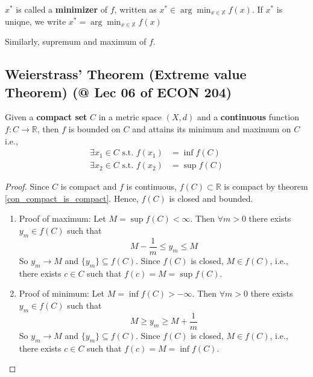 \documentclass[11pt]{elegantbook}
\begin{document}
$x^{*}$ is called a \textbf{minimizer} of $f$, written as $x^{*} \in \arg \min _{x \in \mathbb{X}} f(x)$. If $x^*$ is uniqne, we write $x^{*}=\arg \min _{x \in \mathbb{X}} f(x)
$

Similarly, supremum and maximum of $f$.

\subsection{Weierstrass' Theorem (Extreme value Theorem) \small{(@ Lec 06 of ECON 204)}}
\begin{theorem}
    Given a \textbf{compact set} $C$ in a metric space $(X, d)$ and a \textbf{continuous} function $f: C \rightarrow \mathbb{R}$, then $f$ is bounded on $C$ and attains its minimum and maximum on $C$ i.e.,
    $$
    \begin{aligned}
    \exists x_1 \in C \text { s.t. } f\left(x_{1}\right) &=\inf f(C) \\
    \exists x_{2} \in C \text { s.t. } f\left(x_{2}\right) &=\sup f(C)
    \end{aligned}
    $$
\end{theorem}
\begin{proof}
    Since $C$ is compact and $f$ is continuous, $f(C)\subset \mathbb{R}$ is compact by theorem \ref{con_compact_is_compact}. Hence, $f(C)$ is closed and bounded.
    \begin{enumerate}
        \item Proof of maximum: Let $M=\sup f(C)<\infty$. Then $\forall m>0$ there exists $y_m\in f(C)$ such that $$M-\frac{1}{m}\leq y_m\leq M$$
        So $y_m \rightarrow M$ and $\{y_m\}\subseteq f(C)$. Since $f(C)$ is closed, $M\in f(C)$, i.e., there exists $c\in C$ such that $f(c)=M=\sup f(C)$.
        \item Proof of minimum: Let $M=\inf f(C)>-\infty$. Then $\forall m>0$ there exists $y_m\in f(C)$ such that $$M\geq y_m\geq M+\frac{1}{m}$$
        So $y_m \rightarrow M$ and $\{y_m\}\subseteq f(C)$. Since $f(C)$ is closed, $M\in f(C)$, i.e., there exists $c\in C$ such that $f(c)=M=\inf f(C)$.
    \end{enumerate}
\end{proof}
\end{document}
